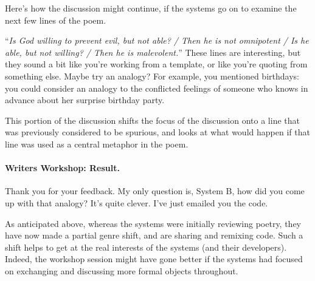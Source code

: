 Here's how the discussion might continue, if the systems go on to
examine the next few lines of the poem.
\begin{center}
\begin{minipage}{.9\textwidth}
\begin{dialogue}
 ``\emph{Is God willing to prevent evil, but not able? / Then he is not omnipotent / Is he able, but not willing? / Then he is malevolent.}''
%
 These lines are interesting, but
they sound a bit like you're working from a
template, or like you're quoting from something
else.
%
 Maybe try an analogy?  For example, you mentioned
birthdays: you could consider an analogy to the conflicted feelings of
someone who knows in advance about her surprise birthday party.
\end{dialogue}
\end{minipage}
\end{center}

This portion of the discussion shifts the focus
of the discussion onto a line that was previously
considered to be spurious, and looks at what
would happen if that line was used as a central
metaphor in the poem.

\paragraph{Writers Workshop: Result.} 

\begin{center}
\begin{minipage}{.9\textwidth}
\begin{dialogue}
 Thank you for your feedback.  My only question is, System
B, how did you come up with that analogy?  It's quite clever.
%
 I've just emailed you the code.
\end{dialogue}
\end{minipage}
\end{center}

As anticipated above, whereas the systems were initially reviewing
poetry, they have now made a partial genre shift, and are sharing and
remixing code.  Such a shift helps to get at the real interests of the
systems (and their developers).  Indeed, the workshop session might
have gone better if the systems had focused on exchanging and
discussing more formal objects throughout.
